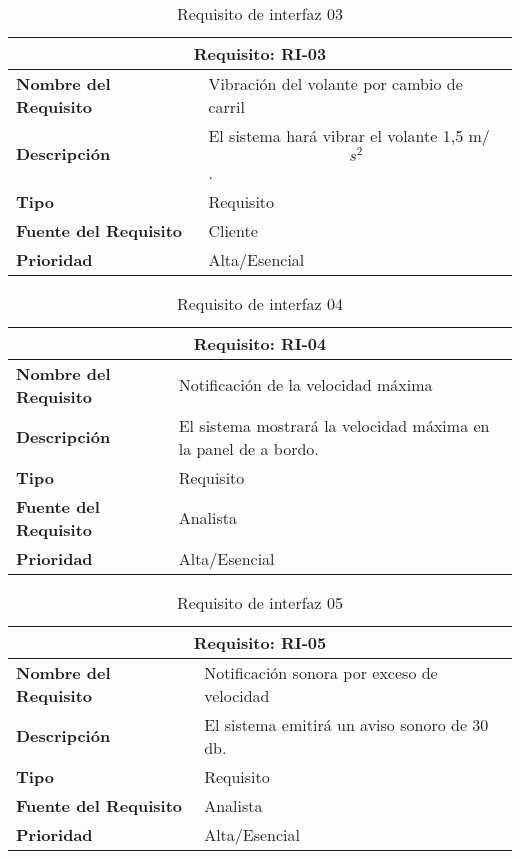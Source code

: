 \begin{table}[H]
\begin{center}
\begin{tabular}{p{} p{7cm}}
\multicolumn{2}{c}{\textbf{Requisito: RI-03} } \\
\hline \hline
\textbf{Nombre del Requisito} & Vibración del volante por cambio de carril\\
\hline
\textbf{Descripción} & El sistema hará vibrar el volante 1,5 m/$$s^2$$. \\
\hline
\textbf{Tipo} & Requisito  \\
\hline
\textbf{Fuente del Requisito} & Cliente \\
\hline
\textbf{Prioridad} & Alta/Esencial  \\ \hline
\end{tabular}
\caption{Requisito de interfaz 03}
\label{tab:RI-03}
\end{center}
\end{table}

\begin{table}[H]
\begin{center}
\begin{tabular}{p{} p{7cm}}
\multicolumn{2}{c}{\textbf{Requisito: RI-04} } \\
\hline \hline
\textbf{Nombre del Requisito} & Notificación de la velocidad máxima\\
\hline
\textbf{Descripción} & El sistema mostrará la velocidad máxima en la panel de a bordo.\\
\hline
\textbf{Tipo} & Requisito  \\
\hline
\textbf{Fuente del Requisito} & Analista \\
\hline
\textbf{Prioridad} & Alta/Esencial  \\ \hline
\end{tabular}
\caption{Requisito de interfaz 04}
\label{tab:RI-04}
\end{center}
\end{table}

\begin{table}[H]
\begin{center}
\begin{tabular}{p{} p{7cm}}
\multicolumn{2}{c}{\textbf{Requisito: RI-05} } \\
\hline \hline
\textbf{Nombre del Requisito} & Notificación sonora por exceso de velocidad\\
\hline
\textbf{Descripción} & El sistema emitirá un aviso sonoro de 30 db. \\
\hline
\textbf{Tipo} & Requisito  \\
\hline
\textbf{Fuente del Requisito} & Analista \\
\hline
\textbf{Prioridad} & Alta/Esencial  \\ \hline
\end{tabular}
\caption{Requisito de interfaz 05}
\label{tab:RI-05}
\end{center}
\end{table}

